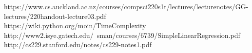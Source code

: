 \documentclass[a4paper]{article}
\begin{document}
\begin{thebibliography}{9}
https://www.cs.auckland.ac.nz/courses/compsci220s1t/lectures/lecturenotes/GG-lectures/220handout-lecture03.pdf
https://wiki.python.org/moin/TimeComplexity
http://www2.isye.gatech.edu/~sman/courses/6739/SimpleLinearRegression.pdf
http://cs229.stanford.edu/notes/cs229-notes1.pdf
\end{thebibliography}
\end{document}
